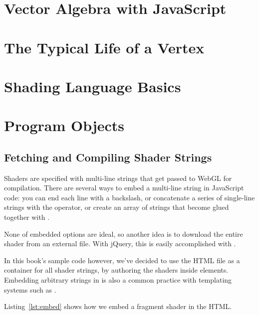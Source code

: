 \section{Vector Algebra with JavaScript}

\section{The Typical Life of a Vertex}

\section{Shading Language Basics}

\section{Program Objects}

\subsection{Fetching and Compiling Shader Strings}

Shaders are specified with multi-line strings that get passed to WebGL for compilation.  There are several ways to embed a multi-line string in JavaScript code: you can end each line with a backslash, or concatenate a series of single-line strings with the \code{+} operator, or create an array of strings that become glued together with .

None of embedded options are ideal, so another idea is to download the entire shader from an external file.  With jQuery, this is easily accomplished with .

In this book's sample code however, we've decided to use the HTML file as a container for all shader strings, by authoring the shaders inside  elements.  Embedding arbitrary strings in  is also a common practice with templating systems such as \mbox{}.

Listing~\ref{lst:embed} shows how we embed a fragment shader in the HTML.

